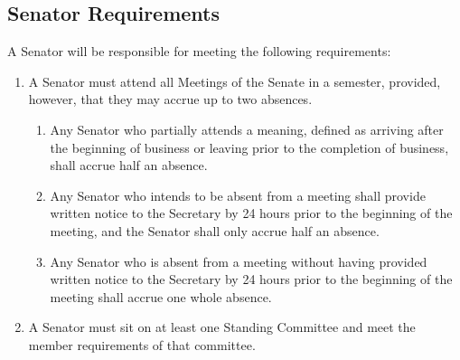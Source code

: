 \documentclass[12pt]{scrreprt}
\begin{document}
\subsection{Senator Requirements}
A Senator will be responsible for meeting the following requirements:
\begin{enumerate}
    \item A Senator must attend all Meetings of the Senate in a semester, provided, however, that they may accrue up to two absences.
    \begin{enumerate}
        \item Any Senator who partially attends a meaning, defined as arriving after the beginning of business or leaving prior to the completion of business, shall accrue half an absence.
        \item Any Senator who intends to be absent from a meeting shall provide written notice to the Secretary by 24 hours prior to the beginning of the meeting, and the Senator shall only accrue half an absence.
        \item Any Senator who is absent from a meeting without having provided written notice to the Secretary by 24 hours prior to the beginning of the meeting shall accrue one whole absence.
    \end{enumerate}
    \item A Senator must sit on at least one Standing Committee and meet the member requirements of that committee.
  

\end{enumerate}
\end{document}
